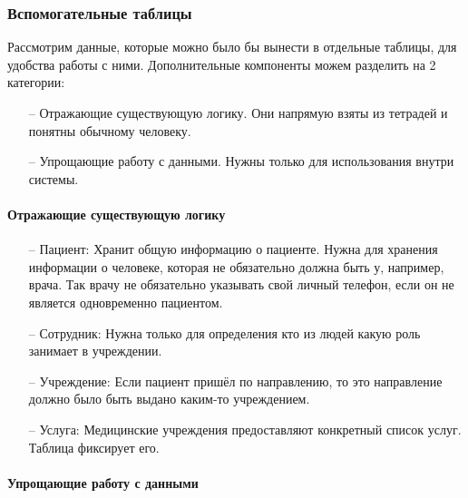 \documentclass[a4paper,article]{article}
\begin{document}
\begin{sloppypar}
    \subsubsection{Вспомогательные таблицы}\label{Проектирование БД. Вспомогательные компоненты}

    Рассмотрим данные, которые можно было бы вынести в отдельные таблицы, для удобства работы с ними. Дополнительные компоненты можем разделить на 2 категории:

    \begin{itemize}[nolistsep]
        \item[--] Отражающие существующую логику. Они напрямую взяты из тетрадей и понятны обычному человеку.
        \item[--] Упрощающие работу с данными. Нужны только для использования внутри системы.
    \end{itemize}

    \paragraph{Отражающие существующую логику}\label{Проектирование БД. Вспомогательные компоненты. Отражающие логику}

    \begin{itemize}[nolistsep]
        \item[--] Пациент: Хранит общую информацию о пациенте. Нужна для хранения информации о человеке, которая не обязательно должна быть у, например, врача. Так врачу не обязательно указывать свой личный телефон, если он не является одновременно пациентом.
        \item[--] Сотрудник: Нужна только для определения кто из людей какую роль занимает в учреждении.
        \item[--] Учреждение: Если пациент пришёл по направлению, то это направление должно было быть выдано каким-то учреждением.
        \item[--] Услуга: Медицинские учреждения предоставляют конкретный список услуг. Таблица фиксирует его.
    \end{itemize}

    \paragraph{Упрощающие работу с данными}\label{Проектирование БД. Вспомогательные компоненты. Упрощающие работу с данными}


\end{sloppypar}
\end{document}
